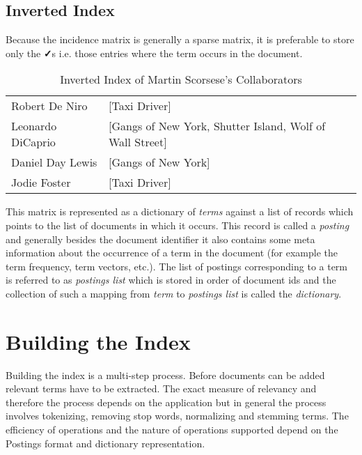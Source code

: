 \subsection{Inverted Index}
Because the incidence matrix is generally a sparse matrix, it is preferable to store only the \textbf{✓}s
i.e. those entries where the term occurs in the document.
\begin{table}[ht]
  \caption{Inverted Index of Martin Scorsese's Collaborators}
  \centering
  \begin{tabular}{p{4cm}p{7cm}}
    \hline \hline
    Robert De Niro    & [Taxi Driver] \\
    Leonardo DiCaprio & [Gangs of New York, Shutter Island, Wolf of Wall Street] \\
    Daniel Day Lewis  & [Gangs of New York] \\
    Jodie Foster      & [Taxi Driver] \\
  \end{tabular}
\end{table}

This matrix is represented as a dictionary of \textit{terms} against a list of records which points to the list of documents in which it occurs.
This record is called a \textit{posting} and generally besides the document identifier it also contains some meta information about the
occurrence of a term in the document (for example the term frequency, term vectors, etc.).
The list of postings corresponding to a term is referred to as \textit{postings list} which is stored in order of document ids
and the collection of such a mapping from \textit{term} to \textit{postings list} is called the \textit{dictionary}.

\section{Building the Index}
Building the index is a multi-step process. Before documents can be added relevant terms have to be extracted.
The exact measure of relevancy and therefore the process depends on the application but in general the process involves
tokenizing, removing stop words, normalizing and stemming terms.
The efficiency of operations and the nature of operations supported depend on the Postings format and dictionary representation.

